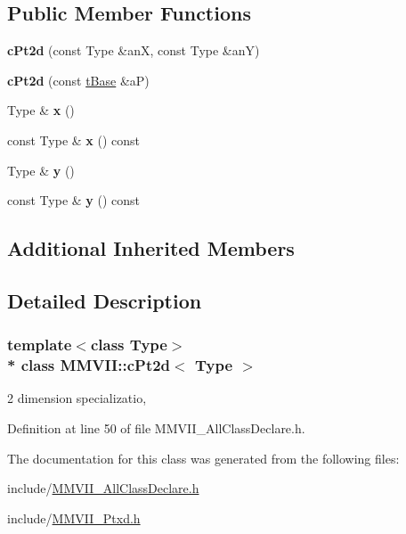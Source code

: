 \subsection*{Public Member Functions}
\begin{DoxyCompactItemize}
\item 
{\bfseries c\+Pt2d} (const Type \&anX, const Type \&anY)\hypertarget{classMMVII_1_1cPt2d_a43fe836ab7ddb8298d80b277af89e66c}{}\label{classMMVII_1_1cPt2d_a43fe836ab7ddb8298d80b277af89e66c}

\item 
{\bfseries c\+Pt2d} (const \hyperlink{classMMVII_1_1cPtxd}{t\+Base} \&aP)\hypertarget{classMMVII_1_1cPt2d_a732f80b113edd16560298b555cf01723}{}\label{classMMVII_1_1cPt2d_a732f80b113edd16560298b555cf01723}

\item 
Type \& {\bfseries x} ()\hypertarget{classMMVII_1_1cPt2d_a46cd677784c74d03236223e3a642038e}{}\label{classMMVII_1_1cPt2d_a46cd677784c74d03236223e3a642038e}

\item 
const Type \& {\bfseries x} () const \hypertarget{classMMVII_1_1cPt2d_a4cad52d5a6b59f4c44230215a53f8e08}{}\label{classMMVII_1_1cPt2d_a4cad52d5a6b59f4c44230215a53f8e08}

\item 
Type \& {\bfseries y} ()\hypertarget{classMMVII_1_1cPt2d_a124c05787c6a8aecaa22b1b5862ee5fd}{}\label{classMMVII_1_1cPt2d_a124c05787c6a8aecaa22b1b5862ee5fd}

\item 
const Type \& {\bfseries y} () const \hypertarget{classMMVII_1_1cPt2d_a2dfae21ae59702c00273d7c619f96ec1}{}\label{classMMVII_1_1cPt2d_a2dfae21ae59702c00273d7c619f96ec1}

\end{DoxyCompactItemize}
\subsection*{Additional Inherited Members}


\subsection{Detailed Description}
\subsubsection*{template$<$class Type$>$\\*
class M\+M\+V\+I\+I\+::c\+Pt2d$<$ Type $>$}

2 dimension specializatio, 

Definition at line 50 of file M\+M\+V\+I\+I\+\_\+\+All\+Class\+Declare.\+h.



The documentation for this class was generated from the following files\+:\begin{DoxyCompactItemize}
\item 
include/\hyperlink{MMVII__AllClassDeclare_8h}{M\+M\+V\+I\+I\+\_\+\+All\+Class\+Declare.\+h}\item 
include/\hyperlink{MMVII__Ptxd_8h}{M\+M\+V\+I\+I\+\_\+\+Ptxd.\+h}\end{DoxyCompactItemize}
